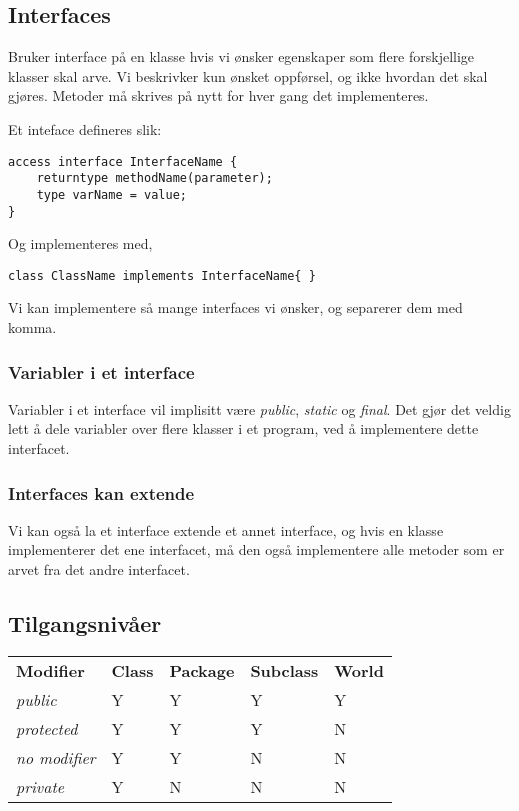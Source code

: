 \documentclass[11pt]{article}
\begin{document}
\subsection{Interfaces}
\label{sec-13_2}

Bruker interface på en klasse hvis vi ønsker egenskaper som flere
forskjellige klasser skal arve. Vi beskrivker kun ønsket oppførsel, og
ikke hvordan det skal gjøres. Metoder må skrives på nytt for hver
gang det implementeres. 

Et inteface defineres slik:

\begin{verbatim}
access interface InterfaceName {
    returntype methodName(parameter);
    type varName = value;
}
\end{verbatim}

Og implementeres med, 

\begin{verbatim}
class ClassName implements InterfaceName{ }
\end{verbatim}

Vi kan implementere så mange interfaces vi ønsker, og separerer dem
med komma.
\subsubsection{Variabler i et interface}
\label{sec-13_2_1}


Variabler i et interface vil implisitt være \emph{public}, \emph{static} og
\emph{final}. Det gjør det veldig lett å dele variabler over flere klasser
i et program, ved å implementere dette interfacet.
\subsubsection{Interfaces kan extende}
\label{sec-13_2_2}


Vi kan også la et interface extende et annet interface, og hvis en
klasse implementerer det ene interfacet, må den også implementere alle
metoder som er arvet fra det andre interfacet.
\subsection{Tilgangsnivåer}
\label{sec-13_3}


\begin{center}
\begin{tabular}{lllll}
 \textbf{Modifier}   &  \textbf{Class}  &  \textbf{Package}  &  \textbf{Subclass}  &  \textbf{World}  \\
 \emph{public}       &  Y               &  Y                 &  Y                  &  Y               \\
 \emph{protected}    &  Y               &  Y                 &  Y                  &  N               \\
 \emph{no modifier}  &  Y               &  Y                 &  N                  &  N               \\
 \emph{private}      &  Y               &  N                 &  N                  &  N               \\
\end{tabular}
\end{center}
\end{document}
